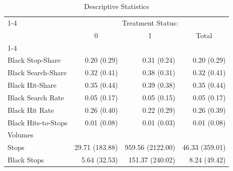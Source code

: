 \begin{table}[!h]
\caption{Descriptive Statistics}
\centering
\begin{tabular}{llll}
\cline{1-4}
\multicolumn{1}{r}{} &
  \multicolumn{3}{c}{Treatment Status:} \\
\multicolumn{1}{r}{} &
  \multicolumn{1}{c}{0} &
  \multicolumn{1}{c}{1} &
  \multicolumn{1}{c}{Total} \\
\cline{1-4}
\multicolumn{1}{l}{Rates} &
  \multicolumn{1}{r}{} &
  \multicolumn{1}{r}{} &
  \multicolumn{1}{r}{} \\
\multicolumn{1}{l}{\hspace{1em}Black Stop-Share} &
  \multicolumn{1}{r}{0.20 (0.29)} &
  \multicolumn{1}{r}{0.31 (0.24)} &
  \multicolumn{1}{r}{0.20 (0.29)} \\
\multicolumn{1}{l}{\hspace{1em}Black Search-Share} &
  \multicolumn{1}{r}{0.32 (0.41)} &
  \multicolumn{1}{r}{0.38 (0.31)} &
  \multicolumn{1}{r}{0.32 (0.41)} \\
\multicolumn{1}{l}{\hspace{1em}Black Hit-Share} &
  \multicolumn{1}{r}{0.35 (0.44)} &
  \multicolumn{1}{r}{0.39 (0.38)} &
  \multicolumn{1}{r}{0.35 (0.44)} \\
\multicolumn{1}{l}{\hspace{1em}Black Search Rate} &
  \multicolumn{1}{r}{0.05 (0.17)} &
  \multicolumn{1}{r}{0.05 (0.15)} &
  \multicolumn{1}{r}{0.05 (0.17)} \\
\multicolumn{1}{l}{\hspace{1em}Black Hit Rate} &
  \multicolumn{1}{r}{0.26 (0.40)} &
  \multicolumn{1}{r}{0.22 (0.29)} &
  \multicolumn{1}{r}{0.26 (0.39)} \\
\multicolumn{1}{l}{\hspace{1em}Black Hits-to-Stops} &
  \multicolumn{1}{r}{0.01 (0.08)} &
  \multicolumn{1}{r}{0.01 (0.03)} &
  \multicolumn{1}{r}{0.01 (0.08)} \\
\multicolumn{1}{l}{Volumes} &
  \multicolumn{1}{r}{} &
  \multicolumn{1}{r}{} &
  \multicolumn{1}{r}{} \\
\multicolumn{1}{l}{\hspace{1em}Stops} &
  \multicolumn{1}{r}{29.71 (183.88)} &
  \multicolumn{1}{r}{959.56 (2122.00)} &
  \multicolumn{1}{r}{46.33 (359.01)} \\
\multicolumn{1}{l}{\hspace{1em}Black Stops} &
  \multicolumn{1}{r}{5.64 (32.53)} &
  \multicolumn{1}{r}{151.37 (240.02)} &
  \multicolumn{1}{r}{8.24 (49.42)} \\

\end{tabular}
\end{table}
